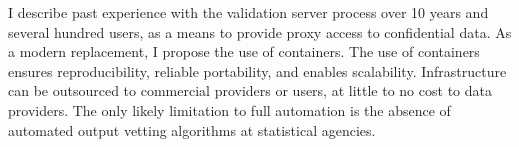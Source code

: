 I describe past experience with the validation server process over 10 years and several hundred users, as a means to provide proxy access to confidential data. As a modern replacement, I propose the use of containers. The use of containers ensures reproducibility, reliable portability, and enables scalability. Infrastructure can be outsourced to commercial providers or users, at little to no cost to data providers. The only likely limitation to full automation is the absence of automated output vetting algorithms at statistical agencies.